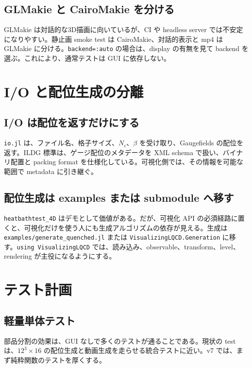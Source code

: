 \documentclass[uplatex,dvipdfmx,ja=standard,11pt,a4paper]{bxjsarticle}
\newcommand{\code}[1]{\texttt{#1}}
\begin{document}
\subsection{GLMakie と CairoMakie を分ける}
GLMakie は対話的な3D描画に向いているが、CI や headless server では不安定になりやすい。静止画 smoke test は CairoMakie、対話的表示と mp4 は GLMakie に分ける。\code{backend=:auto} の場合は、display の有無を見て backend を選ぶ。これにより、通常テストは GUI に依存しない。

\section{I/O と配位生成の分離}
\subsection{I/O は配位を返すだけにする}
\code{io.jl} は、ファイル名、格子サイズ、\(N_c\)、\(\beta\) を受け取り、Gaugefields の配位を返す。ILDG 標準は、ゲージ配位のメタデータを XML schema で扱い、バイナリ配置と packing format を仕様化している\cite{ILDGSpec}。可視化側では、その情報を可能な範囲で metadata に引き継ぐ。

\subsection{配位生成は examples または submodule へ移す}
\code{heatbathtest\_4D} はデモとして価値がある。だが、可視化 API の必須経路に置くと、可視化だけを使う人にも生成アルゴリズムの依存が見える。生成は \code{examples/generate\_quenched.jl} または \code{VisualizingLQCD.Generation} に移す。\code{using VisualizingLQCD} では、読み込み、observable、transform、level、rendering が主役になるようにする。

\section{テスト計画}
\subsection{軽量単体テスト}
部品分割の効果は、GUI なしで多くのテストが通ることである。現状の test は、\(12^3\times16\) の配位生成と動画生成を走らせる統合テストに近い\cite{VisualizingTest}。v7 では、まず純粋関数のテストを厚くする。
\end{document}
